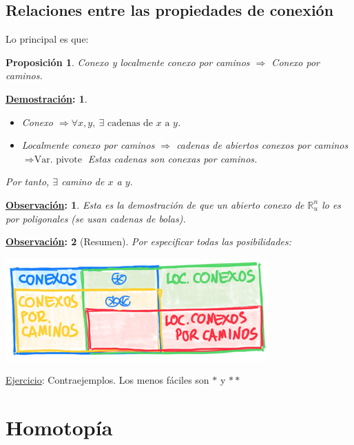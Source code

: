 \documentclass[10pt,a4paper,openright]{book}
\theoremstyle{break}
\newtheorem*{prop}{Proposición}
\newtheorem*{demo}{\underline{Demostración}:}
\newtheorem*{obs}{\underline{Observación}:}
\begin{document}
\section{Relaciones entre las propiedades de conexión}%
\label{sec:relaciones_entre_las_propiedades_de_conexion}
Lo principal es que:
\begin{prop}
Conexo y localmente conexo por caminos $\Rightarrow$ Conexo por caminos.
\end{prop}
\begin{demo}
\begin{itemize}
    \item Conexo $\Rightarrow \forall x, y,\ \exists \text{ cadenas de } x \text{ a } y$.
    \item Localmente conexo por caminos $\Rightarrow$ cadenas de abiertos conexos por caminos $\Rightarrow{\text{Var. pivote}}$ Estas cadenas son conexas por caminos.
\end{itemize}
Por tanto, $\exists$ camino de $x$ a $y$.
\end{demo}
\begin{obs}
    Esta es la demostración de que un abierto conexo de $\mathbb{R}_u^n$ lo es por poligonales (se usan cadenas de bolas).
\end{obs}

\begin{obs}[Resumen]
Por especificar todas las posibilidades:
\begin{center}
    \includegraphics[scale=0.3]{images/resumen_conx} 
\end{center}
\end{obs}

\underline{Ejercicio}: Contraejemplos. Los menos fáciles son $*$ y $**$ 

\chapter{Homotopía}%
\label{cha:homotopia}
\end{document}
